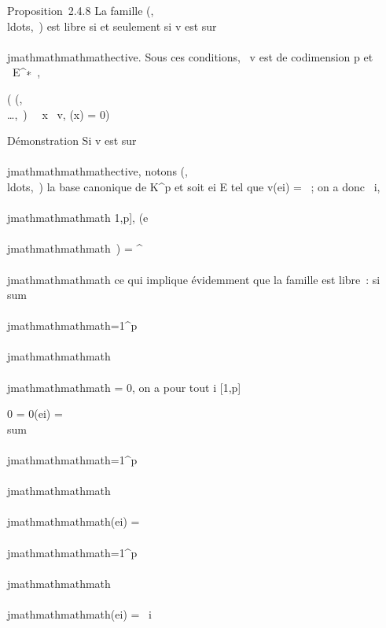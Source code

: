 Proposition~2.4.8 La famille
(,\\ldots,\phip~)
est libre si et seulement si v est sur\\\\jmathmathmathmathective. Sous ces conditions,
\mathrmKer~v est de
codimension p et \forall~\phi \in E^∗~,

(\phi
\in\mathrmVect(,\\\ldots,\phip~)
\Leftrightarrow \forall~~x
\in\mathrmKer~v, \phi(x) = 0)

Démonstration Si v est sur\\\\jmathmathmathmathective, notons
(,\\ldots,\epsilonp~)
la base canonique de K^p et soit ei \in E tel que
v(ei) = \epsiloni~; on a donc
\forall~i,\\\\jmathmathmathmath \in {[}1,p{]}, \phii(e\\\\jmathmathmathmath~) =
\deltai^\\\\jmathmathmathmath ce qui implique évidemment que la famille est
libre~: si \\sum ~
\\\\jmathmathmathmath=1^p\lambda~\\\\jmathmathmathmath\phi\\\\jmathmathmathmath = 0, on a pour tout i \in
{[}1,p{]}

0 = 0(ei) = \\sum
\\\\jmathmathmathmath=1^p\lambda~ \\\\jmathmathmathmath\phi\\\\jmathmathmathmath(ei) =
\sum \\\\jmathmathmathmath=1^p\lambda~~
\\\\jmathmathmathmath\phi\\\\jmathmathmathmath(ei) = \lambda~i

